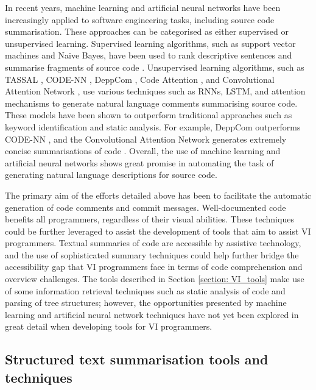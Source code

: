\documentclass{l4proj}
\begin{document}
In recent years, machine learning and artificial neural networks have been increasingly applied to software engineering tasks, including source code summarisation. These approaches can be categorised as either supervised or unsupervised learning. Supervised learning algorithms, such as support vector machines and Naive Bayes, have been used to rank descriptive sentences \cite{rastkar2013code} and summarise fragments of source code \cite{nazar2016source}. Unsupervised learning algorithms, such as TASSAL \cite{fowkes2017autofolding}, CODE-NN \cite{iyer2016summarizing}, DeppCom \cite{hu2018deep}, Code Attention \cite{zheng2017code}, and Convolutional Attention Network \cite{allamanis2016convolutional}, use various techniques such as RNNs, LSTM, and attention mechanisms to generate natural language comments summarising source code. These models have been shown to outperform traditional approaches such as keyword identification and static analysis. For example, DeppCom outperforms CODE-NN \cite{hu2018deep}, and the Convolutional Attention Network generates extremely concise summarisations of code \cite{allamanis2016convolutional}. Overall, the use of machine learning and artificial neural networks shows great promise in automating the task of generating natural language descriptions for source code.


The primary aim of the efforts detailed above has been to facilitate the automatic generation of code comments and commit messages. Well-documented code benefits all programmers, regardless of their visual abilities. These techniques could be further leveraged to assist the development of tools that aim to assist VI programmers. Textual summaries of code are accessible by assistive technology, and the use of sophisticated summary techniques could help further bridge the accessibility gap that VI programmers face in terms of code comprehension and overview challenges. The tools described in Section \ref{section: VI_tools} make use of some information retrieval techniques such as static analysis of code and parsing of tree structures; however, the opportunities presented by machine learning and artificial neural network techniques have not yet been explored in great detail when developing tools for VI programmers.  

\subsection{Structured text summarisation tools and techniques}
\end{document}
